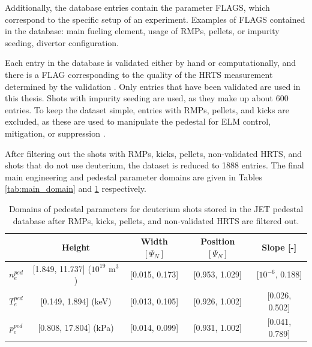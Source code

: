 \documentclass[a4paper, twoside, final, 12pt]{article}
\begin{document}
Additionally, the database entries contain the parameter FLAGS, which correspond to the specific setup of an experiment.
Examples of FLAGS contained in the database: main fueling element, usage of RMPs, pellets, or impurity seeding, divertor configuration. 

Each entry in the database is validated either by hand or computationally, and there is a FLAG corresponding to the quality of the HRTS measurement determined by the validation \cite{Frassinetti_2020}.
Only entries that have been validated are used in this thesis.
Shots with impurity seeding are used, as they make up about 600 entries.
To keep the dataset simple, entries with RMPs, pellets, and kicks are excluded, as these are used to manipulate the pedestal for ELM control, mitigation, or suppression \cite{Viezzer_2018}.

After filtering out the shots with RMPs, kicks, pellets, non-validated HRTS, and shots that do not use deuterium, the dataset is reduced to 1888 entries. The final main engineering and pedestal parameter domains are given in Tables \ref{tab:main_domain} and \ref{tab:ped_quant} respectively.
\begin{center}
\begin{table}[h]
\begin{tabular}{ | c | c | c | c | c | }
	\hline 
	& Height & Width $[\Psi_N]$ & Position $[\Psi_N]$ & Slope [-] \\ 
	\hline
	$n_e^{ped}$ &[1.849, 11.737] ($10^{19}$ m$^3$) & [0.015, 0.173]& [0.953, 1.029] & [$10^{-6}$, 0.188] \\
	$T_e^{ped}$ & [0.149, 1.894] (keV)& [0.013, 0.105] & [0.926, 1.002] & [0.026, 0.502] \\
	$p_e^{ped}$ & [0.808, 17.804] (kPa)& [0.014, 0.099] & [0.931, 1.002]& [0.041, 0.789] \\
	\hline
\end{tabular}
\caption{Domains of pedestal parameters for deuterium shots stored in the JET pedestal database after RMPs, kicks, pellets, and non-validated HRTS are filtered out.}
\label{tab:ped_quant}
\end{table}
\end{center}
\end{document}
